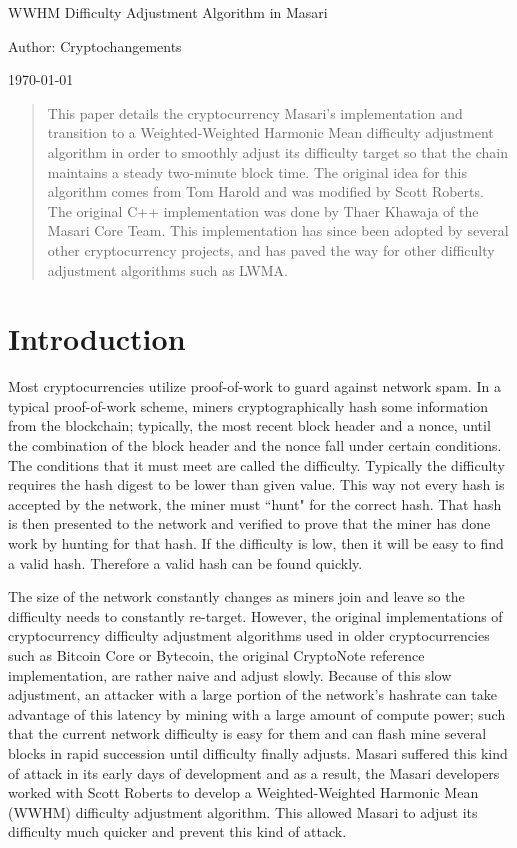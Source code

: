 \documentclass{article}
\author{cryptochangements}
\date{\today}
\begin{document}
\noindent\Large WWHM Difficulty Adjustment Algorithm in Masari

\small\noindent Author: Cryptochangements

\noindent\today
\begin{abstract}
This paper details the
cryptocurrency Masari's implementation
and transition to a Weighted-Weighted
Harmonic Mean difficulty adjustment
algorithm in order to smoothly adjust its difficulty
target so that the chain maintains a steady two-minute
block time. The original idea for this
algorithm comes from Tom Harold and
was modified by Scott Roberts. The original C++
implementation was done by Thaer
Khawaja of the Masari Core Team. This
implementation has since been adopted
by several other cryptocurrency projects,
and has paved the way for other
difficulty adjustment algorithms such as
LWMA.
\end{abstract}

\section{Introduction}
Most cryptocurrencies utilize proof-of-work to guard against network spam. In a typical proof-of-work scheme, miners cryptographically hash some information from the blockchain; typically, the most recent block header and a nonce, until the combination of the block header and the nonce fall under certain conditions. The conditions that it must meet are called the difficulty. Typically the difficulty requires the hash digest to be lower than given value. This way not every hash is accepted by the network, the miner must ``hunt" for the correct hash. That hash is then presented to the network and verified to prove that the miner has done work by hunting for that hash. If the difficulty is low, then it will be easy to find a valid hash. Therefore a valid hash can be found quickly.

The size of the network constantly changes as miners join and leave so the difficulty needs to constantly re-target. However, the original
implementations of cryptocurrency
difficulty adjustment algorithms used in
older cryptocurrencies such as Bitcoin Core or Bytecoin,
the original CryptoNote reference
implementation, are rather naive and
adjust slowly. Because of this slow
adjustment, an attacker with a large
portion of the network's hashrate can take
advantage of this latency by mining with a
large amount of compute power; such that
the current network difficulty is easy for
them and can flash mine several blocks in
rapid succession until difficulty finally
adjusts. Masari suffered this kind of
attack in its early days of development
and as a result, the Masari developers
worked with Scott Roberts to develop a Weighted-Weighted Harmonic Mean (WWHM)
difficulty adjustment algorithm. This allowed Masari to adjust its difficulty
much quicker and prevent this kind of
attack.
\end{document}
